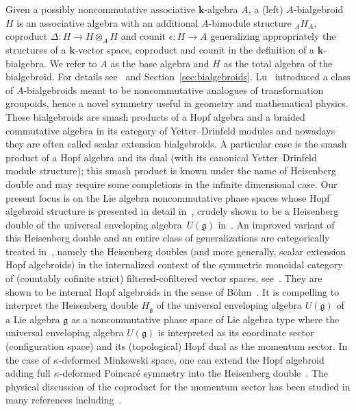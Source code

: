 \documentclass[pdftex]{sigma}
\def\genfd{\mathbf{k}}
\def\gg{\mathfrak{g}}
\numberwithin{equation}{section}
\begin{document}
Given a possibly noncommutative associative $\mathbf{k}$-algebra $A$, a (left) $A$-bialgebroid $H$ is an associative algebra with an additional $A$-bimodule structure ${}_A H_A$, coproduct $\Delta \colon H\to H\otimes_A H$ and counit $\epsilon \colon H\to A$ generalizing appropriately the structures of a $\genfd$-vector space, coproduct and counit in the definition of a $\genfd$-bialgebra. We refer to $A$ as the base algebra and $H$ as the total algebra of the bialgebroid. For details see~\cite{bohmHbk,BrzMilitaru} and Section~\ref{sec:bialgebroids}. Lu~\cite{lu} introduced a class of $A$-bialgebroids meant to be noncommutative analogues of transformation groupoids, hence a novel symmetry useful in geometry and mathematical physics. These bialgebroids are smash products of a Hopf algebra and a braided commutative algebra in its category of Yetter--Drinfeld modules and nowadays they are often called scalar extension bialgebroids. A particular case is the smash product of a Hopf algebra and its dual (with its canonical Yetter--Drinfeld module structure); this smash product is known under the name of Heisenberg double and may require some completions in the infinite dimensional case. Our present focus is on the Lie algebra noncommutative phase spaces whose Hopf algebroid structure is presented in detail in~\cite{halg}, crudely shown to be a Heisenberg double of the universal enveloping algebra~$U(\gg)$ in~\cite{heisd}. An improved variant of this Heisenberg double and an entire class of generalizations are categorically treated in~\cite{stojicPhD}, namely the Heisenberg doubles (and more generally, scalar extension Hopf algebroids) in the internalized context of the symmetric monoidal category of (countably cofinite strict) filtered-cofiltered vector spaces, see~\cite{stojicPhD}. They are shown to be internal Hopf algebroids in the sense of B\"ohm~\cite{BohmInternal}.
It is compelling to interpret the Heisenberg double $H_\gg$ of the universal enveloping algebra $U(\gg)$ of a Lie algebra $\gg$ as a noncommutative phase space of Lie algebra type where the universal enveloping algebra $U(\gg)$ is interpreted as its coordinate sector (configuration space) and its (topological) Hopf dual as the momentum sector. In the case of $\kappa$-deformed Minkowski space, one can extend the Hopf algebroid adding full $\kappa$-deformed Poincar\'e symmetry into the Heisenberg double~\cite{JLZSMWPLB,JLZSMW}. The physical discussion of the coproduct for the momentum sector has been studied in many references including~\cite{Amelino,HallidaySzabo}.
\end{document}
